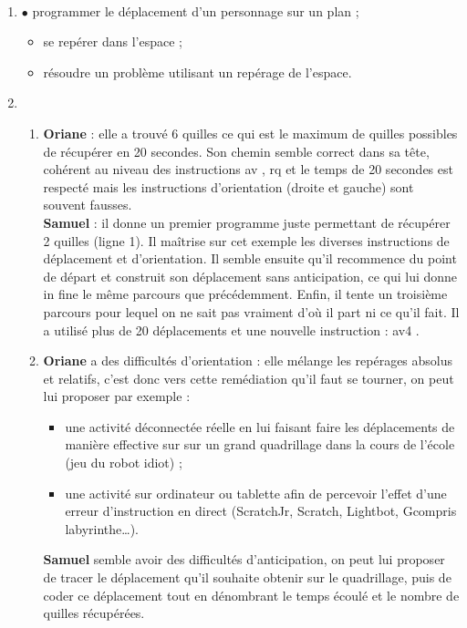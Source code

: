 \ \\ [-5mm]
\begin{enumerate}
   \item \textcolor{A2}{$\bullet$} programmer le déplacement d’un personnage sur un plan ;
   \begin{itemize}
      \item se repérer dans l'espace ;
      \item résoudre un problème utilisant un repérage de l'espace.
   \end{itemize}
   \item
   \begin{enumerate}
      \item {\bf Oriane} : elle a trouvé 6 quilles ce qui est le maximum de quilles possibles de récupérer en 20 secondes. Son chemin semble correct dans sa tête, cohérent au niveau des instructions \og av \fg{}, \og rq \fg{} et le temps de 20 secondes est respecté mais les instructions d'orientation (droite et gauche) sont souvent fausses. \\
      {\bf Samuel} : il donne un premier programme juste permettant de récupérer 2 quilles (ligne 1). Il maîtrise sur cet exemple les diverses instructions de déplacement et d'orientation. Il semble ensuite qu'il recommence du point de départ et construit son déplacement sans anticipation, ce qui lui donne in fine le même parcours que précédemment. Enfin, il tente un troisième parcours pour lequel on ne sait pas vraiment d'où il part ni ce qu'il fait. Il a utilisé plus de 20 déplacements et une nouvelle instruction : \og av4 \fg.
      \item {\bf Oriane} a des difficultés d'orientation : elle mélange les repérages absolus et relatifs, c'est donc vers cette remédiation qu'il faut se tourner, on peut lui proposer par exemple :
      \begin{itemize}
         \item une activité déconnectée réelle en lui faisant faire les déplacements de manière effective sur sur un grand quadrillage dans la cours de l'école (jeu du robot idiot) ;
        \item une activité sur ordinateur ou tablette afin de percevoir l'effet d'une erreur d'instruction en direct (ScratchJr, Scratch, Lightbot, Gcompris labyrinthe\dots).
     \end{itemize}
     {\bf Samuel} semble avoir des difficultés d'anticipation, on peut lui proposer de tracer le déplacement qu'il souhaite obtenir sur le quadrillage, puis de coder ce déplacement tout en dénombrant le temps écoulé et le nombre de quilles récupérées.
   \end{enumerate}
\end{enumerate}
